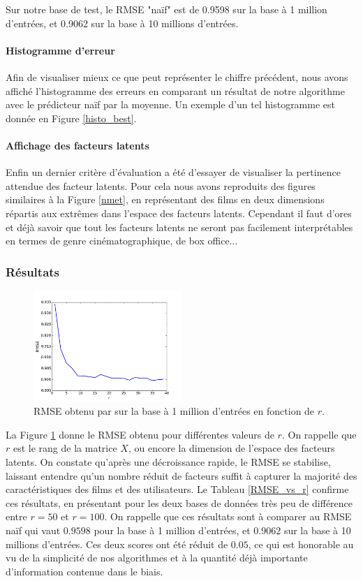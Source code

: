 \documentclass[10pt,a4paper]{article}
\begin{document}
 Sur notre base de test, le RMSE "naïf" est de 0.9598 sur la base à 1 million d'entrées, et 0.9062 sur la base à 10 millions d'entrées.

\paragraph{Histogramme d'erreur} Afin de visualiser mieux ce que peut représenter le chiffre précédent, nous avons affiché l'histogramme des erreurs en comparant un résultat de notre algorithme avec le prédicteur naïf par la moyenne. Un exemple d'un tel histogramme est donnée en Figure \ref{histo_best}.

\paragraph{Affichage des facteurs latents}

Enfin un dernier critère d'évaluation a été d'essayer de visualiser la pertinence attendue des facteur latents. Pour cela nous avons reproduits des figures similaires à la Figure \ref{nmet}, en représentant des films en deux dimensions répartis aux extrêmes dans l'espace des facteurs latents. Cependant il faut d'ores et déjà savoir que tout les facteurs latents ne seront pas facilement interprétables en termes de genre cinématographique, de box office...

\subsubsection*{Résultats}

\begin{figure}[h]
\centering
\includegraphics[width=0.5\textwidth]{fig/rmse_r}
\caption{RMSE obtenu par \jel sur la base à 1 million d'entrées en fonction de $r$.}
\label{rmse_r}
\end{figure}

La Figure \ref{rmse_r} donne le RMSE obtenu pour différentes valeurs de $r$. On rappelle que $r$ est le rang de la matrice $X$, ou encore la dimension de l'espace des facteurs latents. On constate qu'après une décroissance rapide, le RMSE se stabilise, laissant entendre qu'un nombre réduit de facteurs suffit à capturer la majorité des caractéristiques des films et des utilisateurs. Le Tableau \ref{RMSE_vs_r} confirme ces résultats, en présentant pour les deux bases de données très peu de différence entre $r=50$ et $r=100$. On rappelle que ces résultats sont à comparer au RMSE naïf qui vaut $0.9598$ pour la base à 1 million d'entrées, et $0.9062$ sur la base à 10 millions d'entrées. Ces deux scores ont été réduit de $0.05$, ce qui est honorable au vu de la simplicité de nos algorithmes et à la quantité déjà importante d'information contenue dans le biais.
\end{document}
